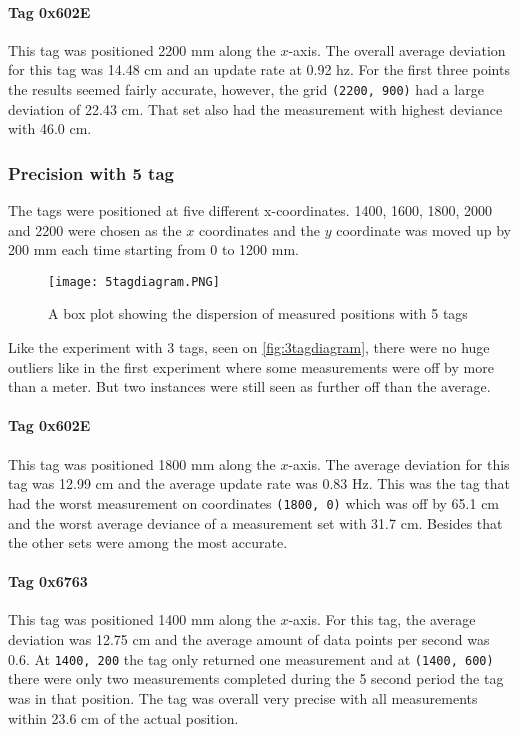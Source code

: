 \paragraph{Tag 0x602E}
This tag was positioned 2200 mm along the $x$-axis.
The overall average deviation for this tag was 14.48 cm and an update rate at 0.92 hz.
For the first three points the results seemed fairly accurate, however, the grid \texttt{(2200, 900)} had a large deviation of 22.43 cm.
That set also had the measurement with highest deviance with 46.0 cm.

\subsubsection{Precision with 5 tag}
The tags were positioned at five different x-coordinates.
1400, 1600, 1800, 2000 and 2200 were chosen as the $x$ coordinates and the $y$ coordinate was moved up by 200 mm each time starting from 0 to 1200 mm.
\begin{figure}[H]
    \centering
    \texttt{[image: 5tagdiagram.PNG]}
    \caption{A box plot showing the dispersion of measured positions with 5 tags}
    \label{fig:5tagdiagram}
\end{figure}
\noindent
Like the experiment with 3 tags, seen on \autoref{fig:3tagdiagram}, there were no huge outliers like in the first experiment where some measurements were off by more than a meter.
But two instances were still seen as further off than the average.


\paragraph{Tag 0x602E}
This tag was positioned 1800 mm along the $x$-axis.
The average deviation for this tag was 12.99 cm and the average update rate was 0.83 Hz.
This was the tag that had the worst measurement on coordinates \texttt{(1800, 0)} which was off by 65.1 cm and the worst average deviance of a measurement set with 31.7 cm.
Besides that the other sets were among the most accurate.

\paragraph{Tag 0x6763}
This tag was positioned 1400 mm along the $x$-axis.
For this tag, the average deviation was 12.75 cm and the average amount of data points per second was 0.6.
At \texttt{1400, 200} the tag only returned one measurement and at \texttt{(1400, 600)} there were only two measurements completed during the 5 second period the tag was in that position.
The tag was overall very precise with all measurements within 23.6 cm of the actual position.

